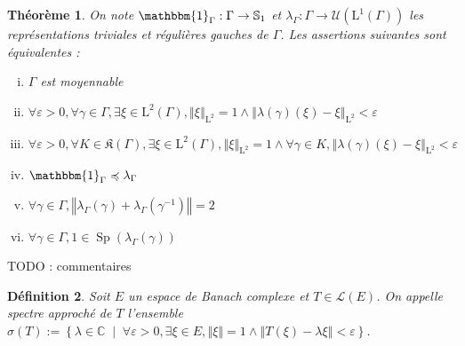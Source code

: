 \documentclass[a4paper,12pt]{article}
\newtheorem{theorem}{Théorème}[section]
\newtheorem{definition}[theorem]{Définition}
\newcommand{\C}{\mathbb{C}}
\newcommand{\norm}[1]{\left\Vert #1\right\Vert}
\newcommand{\set}[1]{\left\{ #1 \right\}}
\newcommand{\indic}{\mathbbm{1}}
\newcommand{\tq}{\;\middle|\;}
\newcommand{\inv}{^{-1}}
\newcommand{\TODO}[1]{{\color{red}TODO :} #1}
\newcommand{\wle}{\preccurlyeq}
\DeclareMathOperator{\Sp}{Sp}
\begin{document}
\begin{theorem}\label{amenable_weak_contain}
    On note $\indic_\Gamma:\Gamma\to\mathbb{S}_1$ et $\lambda_\Gamma:\Gamma\to\mathcal{U}(\mathrm{L}^1(\Gamma))$
    les représentations triviales et régulières gauches de $\Gamma$. Les assertions suivantes sont équivalentes :
    \begin{enumerate}[(i)]
        \item\label{amenable_weak_contain/amenable} $\Gamma$ est moyennable
        \item\label{amenable_weak_contain/weak_almost_invariant} $\forall\varepsilon>0, \forall \gamma\in\Gamma, \exists\xi\in \mathrm{L}^2(\Gamma), \norm{\xi}_{\mathrm{L}^2} = 1 \land \norm{\lambda(\gamma)(\xi) - \xi}_{\mathrm{L}^2}<\varepsilon$
        \item\label{amenable_weak_contain/strong_almost_invariant} $\forall\varepsilon>0, \forall K\in\mathfrak{K}(\Gamma), \exists\xi\in \mathrm{L}^2(\Gamma), \norm{\xi}_{\mathrm{L}^2} = 1 \land \forall \gamma\in K, \norm{\lambda(\gamma)(\xi) - \xi}_{\mathrm{L}^2}<\varepsilon$
        \item\label{amenable_weak_contain/weak_contain} $\indic_\Gamma\wle\lambda_\Gamma$
        \item\label{amenable_weak_contain/norm_eq_two} $\forall\gamma\in\Gamma, \norm{\lambda_\Gamma(\gamma)+\lambda_\Gamma(\gamma\inv)} = 2$
        \item\label{amenable_weak_contain/one_mem_spectrum} $\forall\gamma\in\Gamma, 1\in\Sp(\lambda_\Gamma(\gamma))$
    \end{enumerate}
\end{theorem}

\TODO{commentaires}

\begin{definition}
    Soit $E$ un espace de Banach complexe et $T\in\mathcal{L}(E)$. 
    On appelle \emph{spectre approché de $T$} l'ensemble $\sigma(T) := \set{\lambda\in\C\tq\forall\varepsilon>0, \exists\xi\in E, \norm{\xi}=1\land\norm{T(\xi)-\lambda\xi}<\varepsilon}$.
\end{definition}
\end{document}
